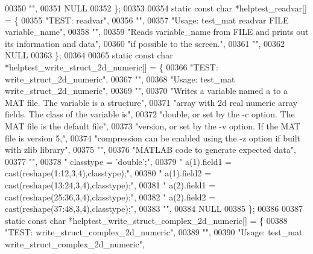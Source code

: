 \begin{DoxyCode}
{00350     \textcolor{stringliteral}{""},
00351     NULL
00352 \};
00353 
00354 \textcolor{keyword}{static} \textcolor{keyword}{const} \textcolor{keywordtype}{char} *helptest\_readvar[] = \{
00355     \textcolor{stringliteral}{"TEST: readvar"},
00356     \textcolor{stringliteral}{""},
00357     \textcolor{stringliteral}{"Usage: test\_mat readvar FILE variable\_name"},
00358     \textcolor{stringliteral}{""},
00359     \textcolor{stringliteral}{"Reads variable\_name from FILE and prints out its information and data"},
00360     \textcolor{stringliteral}{"if possible to the screen."},
00361     \textcolor{stringliteral}{""},
00362     NULL
00363 \};
00364 
00365 \textcolor{keyword}{static} \textcolor{keyword}{const} \textcolor{keywordtype}{char} *helptest\_write\_struct\_2d\_numeric[] = \{
00366     \textcolor{stringliteral}{"TEST: write\_struct\_2d\_numeric"},
00367     \textcolor{stringliteral}{""},
00368     \textcolor{stringliteral}{"Usage: test\_mat write\_struct\_2d\_numeric"},
00369     \textcolor{stringliteral}{""},
00370     \textcolor{stringliteral}{"Writes a variable named a to a MAT file. The variable is a structure"},
00371     \textcolor{stringliteral}{"array with 2d real numeric array fields. The class of the variable is"},
00372     \textcolor{stringliteral}{"double, or set by the -c option. The MAT file is the default file"},
00373     \textcolor{stringliteral}{"version, or set by the -v option. If the MAT file is version 5,"},
00374     \textcolor{stringliteral}{"compression can be enabled using the -z option if built with zlib library"},
00375     \textcolor{stringliteral}{""},
00376     \textcolor{stringliteral}{"MATLAB code to generate expected data"},
00377     \textcolor{stringliteral}{""},
00378     \textcolor{stringliteral}{"    classtype = 'double';"},
00379     \textcolor{stringliteral}{"    a(1).field1 = cast(reshape(1:12,3,4),classtype);"},
00380     \textcolor{stringliteral}{"    a(1).field2 = cast(reshape(13:24,3,4),classtype);"},
00381     \textcolor{stringliteral}{"    a(2).field1 = cast(reshape(25:36,3,4),classtype);"},
00382     \textcolor{stringliteral}{"    a(2).field2 = cast(reshape(37:48,3,4),classtype);"},
00383     \textcolor{stringliteral}{""},
00384     NULL
00385 \};
00386 
00387 \textcolor{keyword}{static} \textcolor{keyword}{const} \textcolor{keywordtype}{char} *helptest\_write\_struct\_complex\_2d\_numeric[] = \{
00388     \textcolor{stringliteral}{"TEST: write\_struct\_complex\_2d\_numeric"},
00389     \textcolor{stringliteral}{""},
00390     \textcolor{stringliteral}{"Usage: test\_mat write\_struct\_complex\_2d\_numeric"},
}
\end{DoxyCode}
